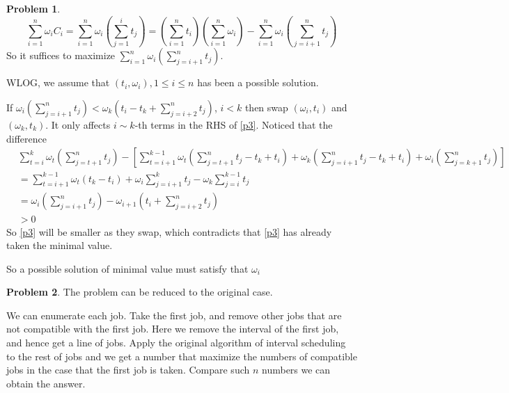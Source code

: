 \documentclass[a4paper]{article}
\theoremstyle{definition}
\newtheorem{problem}{Problem}
\theoremstyle{plain}
\newcommand{\dps}{\displaystyle}
\numberwithin{equation}{problem}
\begin{document}
\begin{problem}
  \begin{equation}\label{p3}
    \sum_{i=1}^n\omega_iC_i=\sum_{i=1}^n\omega_i\left(\sum_{j=1}^it_j\right)=(\sum_{i=1}^nt_i)(\sum_{i=1}^n\omega_i)-\sum_{i=1}^n\omega_i\left(\sum_{j=i+1}^nt_j\right)
  \end{equation}
  So it suffices to maximize  $ \dps\sum_{i=1}^n\omega_i\left(\sum_{j=i+1}^nt_j\right) $.

  WLOG, we assume that  $ (t_i,\omega_i),1 \leq i \leq n $ has been a possible solution.
  
  If  $ \dps\omega_i\left(\sum_{j=i+1}^nt_j\right) < \omega_{k}\left(t_i-t_k+\sum_{j=i+2}^nt_j\right) $, $ i<k $ 
  then swap  $ (\omega_i,t_i) $ and  $ (\omega_{k},t_{k}) $.   It only affects  $ i\sim k $-th terms  in the RHS of  \eqref{p3}. Noticed that the difference
  \begin{align*}
    &\sum_{t=i}^k\omega_t\left(\sum_{j=t+1}^nt_j\right)-\left[\sum_{t=i+1}^{k-1}\omega_t\left(\sum_{j=t+1}^nt_j-t_k+t_i\right)+\omega_k\left(\sum_{j=i+1}^nt_j-t_k+t_i\right)+\omega_i\left(\sum_{j=k+1}^nt_j\right)\right]\\
    &=\sum_{t={i+1}}^{k-1}\omega_t(t_k-t_i)+\omega_i\sum_{j=i+1}^kt_j-\omega_k\sum_{j=i}^{k-1}t_j\\
    &=\omega_i\left(\sum_{j=i+1}^nt_j\right)-\omega_{i+1}\left(t_i+\sum_{j=i+2}^nt_j\right)\\
    & > 0
  \end{align*}
  So \eqref{p3} will be smaller as they swap, which contradicts that  \eqref{p3} has already taken the minimal value. 

  So a possible solution of minimal value must satisfy that  $ \omega_i $ 
\end{problem}
\begin{problem}
  The problem can be reduced to the original case.
  
  We can enumerate each job. Take the first job, and remove other jobs that are not compatible with the first job. Here we remove the interval of the first job, and hence get a line of jobs. Apply the original algorithm of interval scheduling to the rest of jobs and we get a number that maximize the numbers of compatible jobs in the case that the first job is taken. Compare such  $ n $  numbers we can obtain the answer. 
\end{problem}
\end{document}
